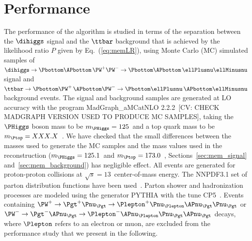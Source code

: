 \section{Performance}
\label{sec:performance}

The performance of the algorithm is studied in terms of the separation between the $\dihiggs$ signal and the $\ttbar$ background 
that is achieved by the likelihood ratio $P$ given by Eq.~(\ref{eq:memLR}),
using Monte Carlo (MC) simulated samples of 
$\dihiggs \to \Pbottom\APbottom \, \PW^{+}\PW^{-} \to \Pbottom\APbottom \, \ellPlusnu\ellMinusnu$ signal 
and $\ttbar \to \Pbottom\PW^{+} \, \APbottom\PW^{-} \to \Pbottom\ellPlusnu \, \APbottom\ellMinusnu$ background events.
The signal and background samples are generated at LO accuracy with the program MadGraph\_aMCatNLO 2.2.2~\cite{MadGraph_aMCatNLO}[CV: CHECK MADGRAPH VERSION USED TO PRODUCE MC SAMPLES],
taking the $\PHiggs$ boson mass to be $m_{\PHiggs} = 125$~\GeV and a top quark mass to be $m_{\Ptop} = XXX.X$~.
We have checked that the small differences between the masses used to generate the MC samples
and the mass values used in the reconstruction ($m_{\PHiggs} = 125.1$~\GeV and $m_{\Ptop} = 173.0$~\GeV, \cf Sections~\ref{sec:mem_signal} and~\ref{sec:mem_background})
has negligible effect.
All events are generated for proton-proton collisions at $\sqrt{s} = 13$~\TeV center-of-mass energy.
The NNPDF3.1 set of parton distribution functions have been used~\cite{NNPDF1,NNPDF2,NNPDF3}.
Parton shower and hadronization processes are modeled using the generator PYTHIA with the tune CP5~\cite{PYTHIA_CP5tune_CMS}.
Events containing $\PW^{+} \to \Pgt^{+}\Pnu_{\Pgt} \to \Plepton^{+}\Pnu_{\Plepton}\APnu_{\Pgt}\Pnu_{\Pgt}$ 
or $\PW^{-} \to \Pgt^{-}\APnu_{\Pgt} \to \Plepton^{-}\APnu_{\Plepton}\Pnu_{\Pgt}\APnu_{\Pgt}$ decays,
where $\Plepton$ refers to an electron or muon, are excluded from the performance study that we present in the following.

